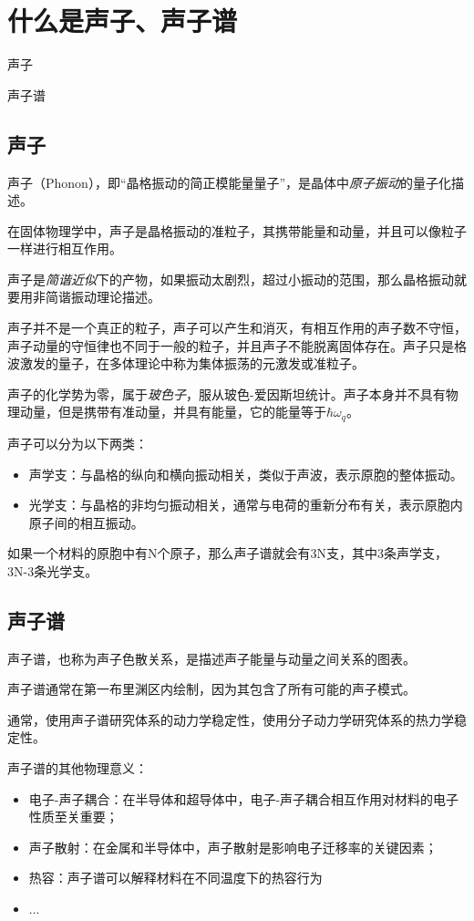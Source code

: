 \section{什么是声子、声子谱} \label{sec:什么是声子、声子谱}


\begin{Abstract}
    \item 声子
    \item 声子谱
\end{Abstract}

\subsection{声子}\label{sec:什么是声子、声子谱-声子}

声子（Phonon），即“晶格振动的简正模能量量子”，是晶体中\emph{原子振动}的量子化描述。

在固体物理学中，声子是晶格振动的准粒子，其携带能量和动量，并且可以像粒子一样进行相互作用。

声子是\emph{简谐近似}下的产物，如果振动太剧烈，超过小振动的范围，那么晶格振动就要用非简谐振动理论描述。

声子并不是一个真正的粒子，声子可以产生和消灭，有相互作用的声子数不守恒，声子动量的守恒律也不同于一般的粒子，并且声子不能脱离固体存在。声子只是格波激发的量子，在多体理论中称为集体振荡的元激发或准粒子。

声子的化学势为零，属于\emph{玻色子}，服从玻色-爱因斯坦统计。声子本身并不具有物理动量，但是携带有准动量，并具有能量，它的能量等于$\hbar\omega_q$。

声子可以分为以下两类：
\begin{itemize}
    \item 声学支：与晶格的纵向和横向振动相关，类似于声波，表示原胞的整体振动。
    \item 光学支：与晶格的非均匀振动相关，通常与电荷的重新分布有关，表示原胞内原子间的相互振动。
\end{itemize}

如果一个材料的原胞中有N个原子，那么声子谱就会有3N支，其中3条声学支，3N-3条光学支。

\subsection{声子谱}\label{sec:什么是声子、声子谱-声子谱}

声子谱，也称为声子色散关系，是描述声子能量与动量之间关系的图表。

声子谱通常在第一布里渊区内绘制，因为其包含了所有可能的声子模式。

通常，使用声子谱研究体系的动力学稳定性，使用分子动力学研究体系的热力学稳定性。

声子谱的其他物理意义：
\begin{itemize}
    \item 电子-声子耦合：在半导体和超导体中，电子-声子耦合相互作用对材料的电子性质至关重要；
    \item 声子散射：在金属和半导体中，声子散射是影响电子迁移率的关键因素；
    \item 热容：声子谱可以解释材料在不同温度下的热容行为
    \item ...
\end{itemize}
